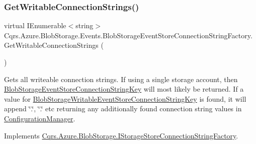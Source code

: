 \mbox{\label{classCqrs_1_1Azure_1_1BlobStorage_1_1Events_1_1BlobStorageEventStoreConnectionStringFactory_a002b45d6a893b1b3024b0e7c97f1c9ac_a002b45d6a893b1b3024b0e7c97f1c9ac}} 
\subsubsection{\texorpdfstring{Get\+Writable\+Connection\+Strings()}{GetWritableConnectionStrings()}}
{\footnotesize\ttfamily virtual I\+Enumerable$<$string$>$ Cqrs.\+Azure.\+Blob\+Storage.\+Events.\+Blob\+Storage\+Event\+Store\+Connection\+String\+Factory.\+Get\+Writable\+Connection\+Strings (\begin{DoxyParamCaption}{ }\end{DoxyParamCaption})\hspace{0.3cm}{\ttfamily [virtual]}}



Gets all writeable connection strings. If using a single storage account, then \hyperlink{classCqrs_1_1Azure_1_1BlobStorage_1_1Events_1_1BlobStorageEventStoreConnectionStringFactory_a36edb24cf0ef60114fc344b5d0bb619d_a36edb24cf0ef60114fc344b5d0bb619d}{Blob\+Storage\+Event\+Store\+Connection\+String\+Key} will most likely be returned. If a value for \hyperlink{classCqrs_1_1Azure_1_1BlobStorage_1_1Events_1_1BlobStorageEventStoreConnectionStringFactory_a3bf39254f211e4fbcbd9bc108c8d9fbc_a3bf39254f211e4fbcbd9bc108c8d9fbc}{Blob\+Storage\+Writable\+Event\+Store\+Connection\+String\+Key} is found, it will append \char`\"{}.\char`\"{}, \char`\"{}.\char`\"{} etc returning any additionally found connection string values in \hyperlink{namespaceCqrs_1_1Azure_1_1ConfigurationManager}{Configuration\+Manager}. 



Implements \hyperlink{interfaceCqrs_1_1Azure_1_1BlobStorage_1_1IStorageStoreConnectionStringFactory_a26ecfd0805fe3d525e9fa419330bd140_a26ecfd0805fe3d525e9fa419330bd140}{Cqrs.\+Azure.\+Blob\+Storage.\+I\+Storage\+Store\+Connection\+String\+Factory}.



